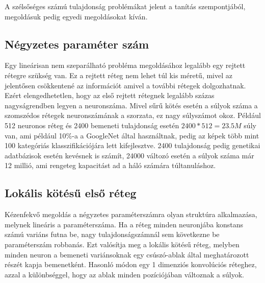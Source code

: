 A szélsőséges számú tulajdonság problémákat jelent a tanítás szempontjából, megoldásuk pedig egyedi megoldásokat kíván.

\subsection{Négyzetes paraméter szám}
	
Egy lineárisan nem szeparálható probléma megoldásához legalább egy rejtett rétegre szükség van. Ez a rejtett réteg nem lehet túl kis méretű, mivel az jelentősen csökkentené az információt amivel a további rétegek dolgozhatnak.
Ezért elengedhetetlen, hogy az első rejtett rétegnek legalább százas nagyságrendben legyen a neuronszáma. Mivel sűrű kötés esetén a súlyok száma a szomszédos rétegek neuronszámának a szorzata, ez nagy súlyszámot okoz. Például 512 neuronos réteg és 2400 bemeneti tulajdonság esetén $2400*512 = 23.5M$ súly van, ami például 10\%-a a GoogleNet által használtnak, pedig az képek több mint 100 kategóriás klasszifikációjára lett kifejlesztve. 2400 tulajdonság pedig genetikai adatbázisok esetén kevésnek is számít, 24000 változó esetén a súlyok száma már 12 millió, ami rengeteg kapacitást ad a háló számára túltanuláshoz.

\subsection{Lokális kötésű első réteg}

Kézenfekvő megoldás a négyzetes paraméterszámra olyan struktúra alkalmazása, melynek lineáris a paraméterszáma. Ha a réteg minden neuronjába konstans számú variáns futna be, nagy tulajdonságszámnál sem következne be paraméterszám robbanás. Ezt valósítja meg a lokális kötésű réteg, melyben minden neuron a bemeneti variánsoknak egy csúszó-ablak által meghatározott részét kapja bemenetként. Hasonló módon egy 1 dimenziós  konvolúciós réteghez, azzal a különbséggel, hogy az ablak minden pozíciójában változnak a súlyok.

